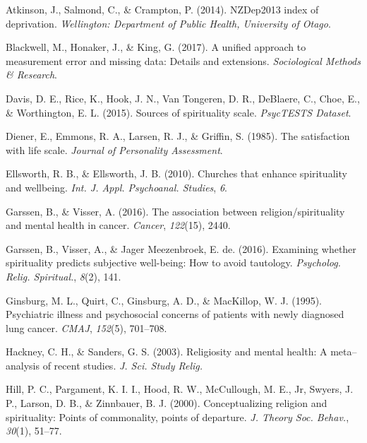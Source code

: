 \documentclass[
  english,
  man]{apa6}
\begin{document}
\leavevmode\hypertarget{ref-Atkinson2014-ex}{}%
Atkinson, J., Salmond, C., \& Crampton, P. (2014). NZDep2013 index of deprivation. \emph{Wellington: Department of Public Health, University of Otago}.

\leavevmode\hypertarget{ref-Blackwell2017-oq}{}%
Blackwell, M., Honaker, J., \& King, G. (2017). A unified approach to measurement error and missing data: Details and extensions. \emph{Sociological Methods \& Research}.

\leavevmode\hypertarget{ref-Davis2015-tx}{}%
Davis, D. E., Rice, K., Hook, J. N., Van Tongeren, D. R., DeBlaere, C., Choe, E., \& Worthington, E. L. (2015). Sources of spirituality scale. \emph{PsycTESTS Dataset}.

\leavevmode\hypertarget{ref-Diener1985-xy}{}%
Diener, E., Emmons, R. A., Larsen, R. J., \& Griffin, S. (1985). The satisfaction with life scale. \emph{Journal of Personality Assessment}.

\leavevmode\hypertarget{ref-Ellsworth2010-yu}{}%
Ellsworth, R. B., \& Ellsworth, J. B. (2010). Churches that enhance spirituality and wellbeing. \emph{Int. J. Appl. Psychoanal. Studies}, \emph{6}.

\leavevmode\hypertarget{ref-Garssen2016-km}{}%
Garssen, B., \& Visser, A. (2016). The association between religion/spirituality and mental health in cancer. \emph{Cancer}, \emph{122}(15), 2440.

\leavevmode\hypertarget{ref-Garssen2016-kb}{}%
Garssen, B., Visser, A., \& Jager Meezenbroek, E. de. (2016). Examining whether spirituality predicts subjective well-being: How to avoid tautology. \emph{Psycholog. Relig. Spiritual.}, \emph{8}(2), 141.

\leavevmode\hypertarget{ref-Ginsburg1995-jr}{}%
Ginsburg, M. L., Quirt, C., Ginsburg, A. D., \& MacKillop, W. J. (1995). Psychiatric illness and psychosocial concerns of patients with newly diagnosed lung cancer. \emph{CMAJ}, \emph{152}(5), 701--708.

\leavevmode\hypertarget{ref-Hackney2003-rs}{}%
Hackney, C. H., \& Sanders, G. S. (2003). Religiosity and mental health: A meta--analysis of recent studies. \emph{J. Sci. Study Relig.}

\leavevmode\hypertarget{ref-Hill2000-cl}{}%
Hill, P. C., Pargament, K. I. I., Hood, R. W., McCullough, M. E., Jr, Swyers, J. P., Larson, D. B., \& Zinnbauer, B. J. (2000). Conceptualizing religion and spirituality: Points of commonality, points of departure. \emph{J. Theory Soc. Behav.}, \emph{30}(1), 51--77.
\end{document}
